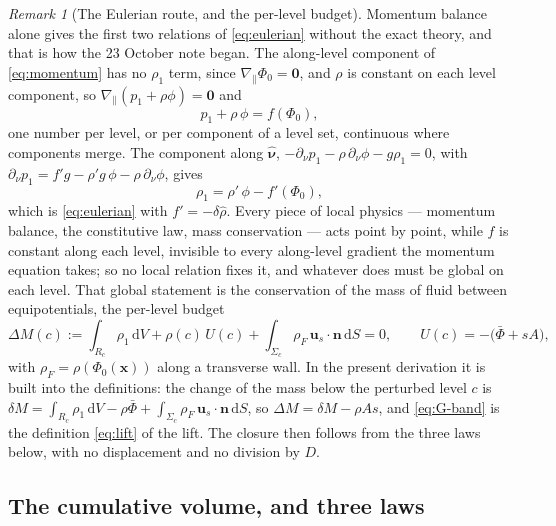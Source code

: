 \documentclass[11pt]{article}
\theoremstyle{definition}
\theoremstyle{remark}
\newtheorem{remark}{Remark}
\newcommand{\bu}{\mathbf{u}}
\newcommand{\bn}{\mathbf{n}}
\newcommand{\bx}{\mathbf{x}}
\newcommand{\dS}{\,\mathrm{d}S}
\newcommand{\dV}{\,\mathrm{d}V}
\newcommand{\nuh}{\hat{\boldsymbol{\nu}}}
\begin{document}
\begin{remark}[The Eulerian route, and the per-level budget]
\label{rem:eulerian-route}
Momentum balance alone gives the first two relations of
\eqref{eq:eulerian} without the exact theory, and that is how the 23
October note began. The along-level component of \eqref{eq:momentum}
has no $\rho_1$ term, since $\nabla_{\!\parallel}\Phi_0 = \mathbf 0$, and
$\rho$ is constant on each level component, so
$\nabla_{\!\parallel}(p_1 + \rho\phi) = \mathbf 0$ and
\begin{equation}
  p_1 + \rho\,\phi = f(\Phi_0) ,
  \label{eq:G-f}
\end{equation}
one number per level, or per component of a level set, continuous
where components merge. The component along $\nuh$, $-\partial_\nu p_1
- \rho\,\partial_\nu\phi - g\rho_1 = 0$, with $\partial_\nu p_1 = f'g -
\rho' g\,\phi - \rho\,\partial_\nu\phi$, gives
\begin{equation}
  \rho_1 = \rho'\,\phi - f'(\Phi_0) ,
  \label{eq:G-rho}
\end{equation}
which is \eqref{eq:eulerian} with $f' = -\delta\hat\rho$. Every piece of
local physics --- momentum balance, the constitutive law, mass
conservation --- acts point by point, while $f$ is constant along each
level, invisible to every along-level gradient the momentum equation
takes; so no local relation fixes it, and whatever does must be global
on each level. That global statement is the
conservation of the mass of fluid between equipotentials, the
per-level budget
\begin{equation}
  \Delta M(c) := \int_{R_c}\rho_1\dV + \rho(c)\,U(c)
  + \int_{\Sigma_c}\rho_F\,\bu_s\cdot\bn\dS = 0,
  \qquad U(c) = -\bigl(\bar\Phi + sA\bigr),
  \label{eq:G-band}
\end{equation}
with $\rho_F = \rho(\Phi_0(\bx))$ along a transverse wall. In the
present derivation it is built into the definitions: the change of the
mass below the perturbed level $c$ is $\delta M = \int_{R_c}\rho_1\dV -
\rho\bar\Phi + \int_{\Sigma_c}\rho_F\,\bu_s\cdot\bn\dS$, so $\Delta M =
\delta M - \rho A s$, and \eqref{eq:G-band} is the definition
\eqref{eq:lift} of the lift. The closure then follows from the three
laws below, with no displacement and no division by $D$.
\end{remark}

\subsection{The cumulative volume, and three laws}
\label{sec:threelaws}
\end{document}
